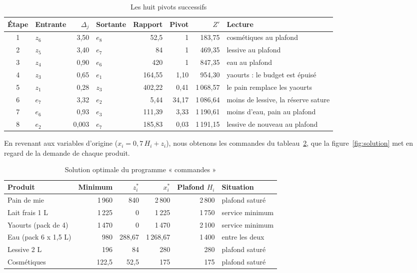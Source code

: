 \documentclass[11pt,a4paper]{article}
\begin{document}
\begin{table}[!htbp]
\centering\small
\caption{Les huit pivots successifs}\label{tab:pivots}
\begin{tabular}{@{}clrlrrrl@{}}
\toprule
Étape & Entrante & $\Delta_j$ & Sortante & Rapport & Pivot & $Z'$ & Lecture \\
\midrule
1 & $z_6$ & 3,50 & $e_8$ & 52,5 & 1 & 183,75 & cosmétiques au plafond \\
2 & $z_5$ & 3,40 & $e_7$ & 84 & 1 & 469,35 & lessive au plafond \\
3 & $z_4$ & 0,90 & $e_6$ & 420 & 1 & 847,35 & eau au plafond \\
4 & $z_3$ & 0,65 & $e_1$ & 164,55 & 1,10 & 954,30 & yaourts : le budget est épuisé \\
5 & $z_1$ & 0,28 & $z_3$ & 402,22 & 0,41 & 1\,068,57 & le pain remplace les yaourts \\
6 & $e_7$ & 3,32 & $e_2$ & 5,44 & 34,17 & 1\,086,64 & moins de lessive, la réserve sature \\
7 & $e_6$ & 0,93 & $e_3$ & 111,39 & 3,33 & 1\,190,61 & moins d'eau, pain au plafond \\
8 & $e_2$ & 0,003 & $e_7$ & 185,83 & 0,03 & 1\,191,15 & lessive de nouveau au plafond \\
\bottomrule
\end{tabular}
\end{table}

En revenant aux variables d'origine ($x_i = 0{,}7\,H_i + z_i$), nous obtenons les commandes du
tableau~\ref{tab:solution}, que la figure~\ref{fig:solution} met en regard de la demande de
chaque produit.

\begin{table}[!htbp]
\centering\small
\caption{Solution optimale du programme « commandes »}\label{tab:solution}
\begin{tabular}{@{}lrrrrl@{}}
\toprule
Produit & Minimum & $z_i^{*}$ & $x_i^{*}$ & Plafond $H_i$ & Situation \\
\midrule
Pain de mie          & 1\,960 & 840    & 2\,800    & 2\,800 & plafond saturé \\
Lait frais 1 L       & 1\,225 & 0      & 1\,225    & 1\,750 & service minimum \\
Yaourts (pack de 4)  & 1\,470 & 0      & 1\,470    & 2\,100 & service minimum \\
Eau (pack 6 x 1,5 L) & 980    & 288,67 & 1\,268,67 & 1\,400 & entre les deux \\
Lessive 2 L          & 196    & 84     & 280       & 280    & plafond saturé \\
Cosmétiques          & 122,5  & 52,5   & 175       & 175    & plafond saturé \\
\bottomrule
\end{tabular}
\end{table}
\end{document}
